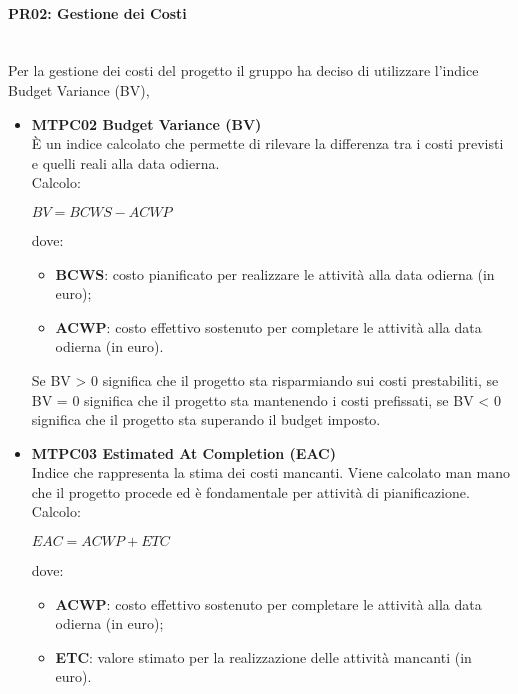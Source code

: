 \paragraph{PR02: Gestione dei Costi} \-\\
Per la gestione dei costi del progetto il gruppo ha deciso di utilizzare l'indice Budget Variance (BV),

\begin{itemize}

\item \textbf{MTPC02 Budget Variance (BV)}\-\\
È un indice calcolato che permette di rilevare la differenza tra i costi previsti e quelli reali alla data odierna. \\
Calcolo:
\begin{center}
	$BV = BCWS - ACWP$
\end{center} 
dove:
\begin{itemize}
	\item \textbf{BCWS}: costo pianificato per realizzare le attività alla data odierna (in euro);
	\item \textbf{ACWP}: costo effettivo sostenuto per completare le attività alla data odierna (in euro).
\end{itemize}
Se BV > 0 significa che il progetto sta risparmiando sui costi prestabiliti, se BV = 0 significa che il progetto sta mantenendo i costi prefissati, se BV < 0 significa che il progetto sta superando il budget imposto.

\item \textbf{MTPC03 Estimated At Completion (EAC)}\-\\
Indice che rappresenta la stima dei costi mancanti. Viene calcolato man mano che il progetto procede ed è fondamentale per attività di pianificazione. \\
Calcolo:
\begin{center}
	$EAC = ACWP + ETC$
\end{center}
dove:
\begin{itemize}
	\item \textbf{ACWP}: costo effettivo sostenuto per completare le attività alla data odierna (in euro);
	\item \textbf{ETC}: valore stimato per la realizzazione delle attività mancanti (in euro).
\end{itemize}

\end{itemize}

\iffalse
